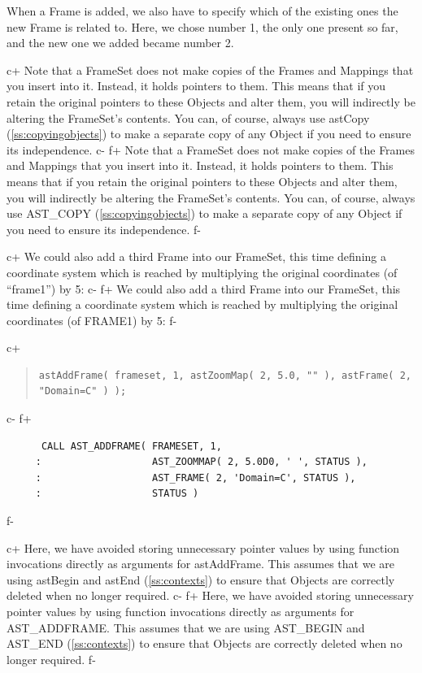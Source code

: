 \documentclass[twoside,11pt]{article}
\newcommand{\secref}[1]{\S\ref{#1}}
\renewcommand{\secref}[1]{\ref{#1}}
\begin{document}
When a Frame is added, we also have to specify which of the existing
ones the new Frame is related to. Here, we chose number 1, the only
one present so far, and the new one we added became number 2.

c+
Note that a FrameSet does not make copies of the Frames and Mappings
that you insert into it. Instead, it holds pointers to them. This
means that if you retain the original pointers to these Objects and
alter them, you will indirectly be altering the FrameSet's
contents. You can, of course, always use astCopy
(\secref{ss:copyingobjects}) to make a separate copy of any Object if
you need to ensure its independence.
c-
f+
Note that a FrameSet does not make copies of the Frames and Mappings
that you insert into it. Instead, it holds pointers to them. This
means that if you retain the original pointers to these Objects and
alter them, you will indirectly be altering the FrameSet's
contents. You can, of course, always use AST\_COPY
(\secref{ss:copyingobjects}) to make a separate copy of any Object if
you need to ensure its independence.
f-

c+
We could also add a third Frame into our FrameSet, this time defining
a coordinate system which is reached by multiplying the original
coordinates (of ``frame1'') by 5:
c-
f+
We could also add a third Frame into our FrameSet, this time defining
a coordinate system which is reached by multiplying the original
coordinates (of FRAME1) by 5:
f-

c+
\begin{quote}
\small
\begin{verbatim}
astAddFrame( frameset, 1, astZoomMap( 2, 5.0, "" ), astFrame( 2, "Domain=C" ) );
\end{verbatim}
\normalsize
\end{quote}
c-
f+
\small
\begin{verbatim}
      CALL AST_ADDFRAME( FRAMESET, 1,
     :                   AST_ZOOMMAP( 2, 5.0D0, ' ', STATUS ),
     :                   AST_FRAME( 2, 'Domain=C', STATUS ),
     :                   STATUS )
\end{verbatim}
\normalsize
f-

c+
Here, we have avoided storing unnecessary pointer values by using
function invocations directly as arguments for astAddFrame. This
assumes that we are using astBegin and astEnd (\secref{ss:contexts}) to
ensure that Objects are correctly deleted when no longer required.
c-
f+
Here, we have avoided storing unnecessary pointer values by using
function invocations directly as arguments for AST\_ADDFRAME. This
assumes that we are using AST\_BEGIN and AST\_END
(\secref{ss:contexts}) to ensure that Objects are correctly deleted
when no longer required.
f-
\end{document}
